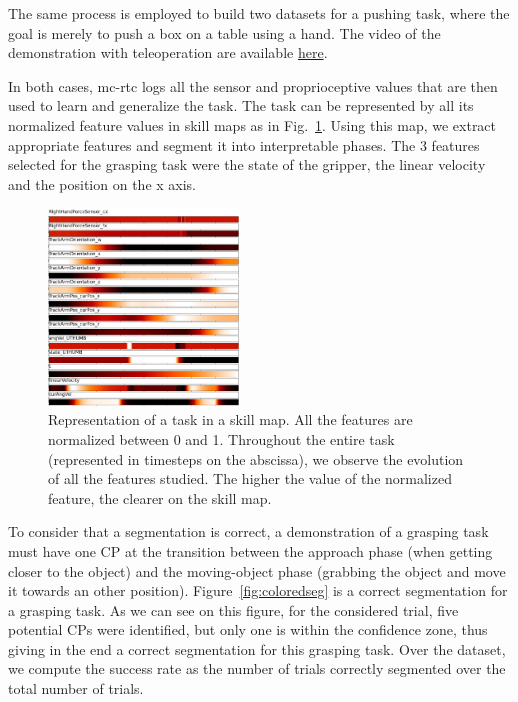 \documentclass[a4paper, 10pt, conference]{ieeeconf}
\begin{document}
 The same process is employed to build two datasets for a pushing task, where the goal is merely to push a box on a table using a hand. The video of the demonstration with teleoperation are available \href{https://github.com/VictorBbt/Article_TaskGeneralization}{here}.

 In both cases, mc-rtc logs all the sensor and proprioceptive values that are then used to learn and generalize the task. The task can be represented by all its normalized feature values in skill maps as in Fig.~\ref{fig:skillmap}. Using this map, we extract appropriate features and segment it into interpretable phases. The 3 features selected for the grasping task were the state of the gripper, the linear velocity and the position on the x axis. %

 \begin{figure}[t]
  \centering
  \includegraphics[width=0.45\textwidth]{img/skillMap.pdf}
  \caption{Representation of a task in a skill map. All the features are normalized between 0 and 1. Throughout the entire task (represented in timesteps on the abscissa), we observe the evolution of all the features studied. The higher the value of the normalized feature, the clearer on the skill map.}
  \label{fig:skillmap}
\end{figure}

To consider that a segmentation is correct, a demonstration of a grasping task must have one CP at the transition between the approach phase (when getting closer to the object) and the moving-object phase (grabbing the object and move it towards an other position). 
Figure~\ref{fig:coloredseg} is a correct segmentation for a grasping task. As we can see on this figure, for the considered trial, five potential CPs were identified, but only one is within the confidence zone, thus giving in the end a correct segmentation for this grasping task. Over the dataset, we compute the success rate as the number of trials correctly segmented over the total number of trials.
\end{document}
